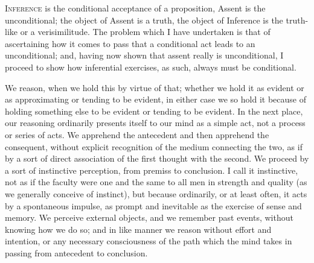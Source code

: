 

I\textsc{nference} is the conditional acceptance of a proposition,
Assent is the unconditional; the object of Assent is a truth, the
object of Inference is the truth-like or a verisimilitude. The problem
which I have undertaken is that of ascertaining how it comes to pass
that a conditional act leads to an unconditional; and, having now
shown that assent really is unconditional, I proceed to show how
inferential exercises, as such, always must be conditional.

We reason, when we hold this by virtue of that; whether we hold it
as evident or as approximating or tending to be evident, in either
case we so hold it because of holding something else to be evident or
tending to be evident. In the next place, our reasoning ordinarily
presents itself to our mind as a simple act, not a process or series
of acts. We apprehend the antecedent and then apprehend the
consequent, without explicit recognition of the medium
connecting the two, as if by a sort of direct association of the first
thought with the second. We proceed by a sort of instinctive
perception, from premiss to conclusion. I call it instinctive, not as
if the faculty were one and the same to all men in strength and
quality (as we generally conceive of instinct), but because
ordinarily, or at least often, it acts by a spontaneous impulse, as
prompt and inevitable as the exercise of sense and memory. We perceive
external objects, and we remember past events, without knowing how we
do so; and in like manner we reason without effort and intention, or
any necessary consciousness of the path which the mind takes in
passing from antecedent to conclusion.

